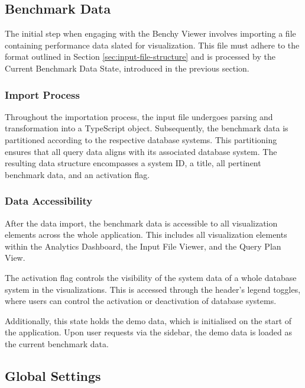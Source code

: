\subsection{Benchmark Data}\label{sec:input-data}

The initial step when engaging with the Benchy Viewer involves importing a file containing performance data slated for visualization. This file must adhere to the format outlined in Section \ref{sec:input-file-structure} and is processed by the Current Benchmark Data State, introduced in the previous section. 

\subsubsection{Import Process}

Throughout the importation process, the input file undergoes parsing and transformation into a TypeScript object. Subsequently, the benchmark data is partitioned according to the respective database systems. This partitioning ensures that all query data aligns with its associated database system. The resulting data structure encompasses a system ID, a title, all pertinent benchmark data, and an activation flag.

\subsubsection{Data Accessibility}

After the data import, the benchmark data is accessible to all visualization elements across the whole application. This includes all visualization elements within the Analytics Dashboard, the Input File Viewer, and the Query Plan View.

The activation flag controls the visibility of the system data of a whole database system in the visualizations. This is accessed through the header's legend toggles, where users can control the activation or deactivation of database systems.

Additionally, this state holds the demo data, which is initialised on the start of the application. Upon user requests via the sidebar, the demo data is loaded as the current benchmark data.



\subsection{Global Settings}\label{sec:global-settings}


